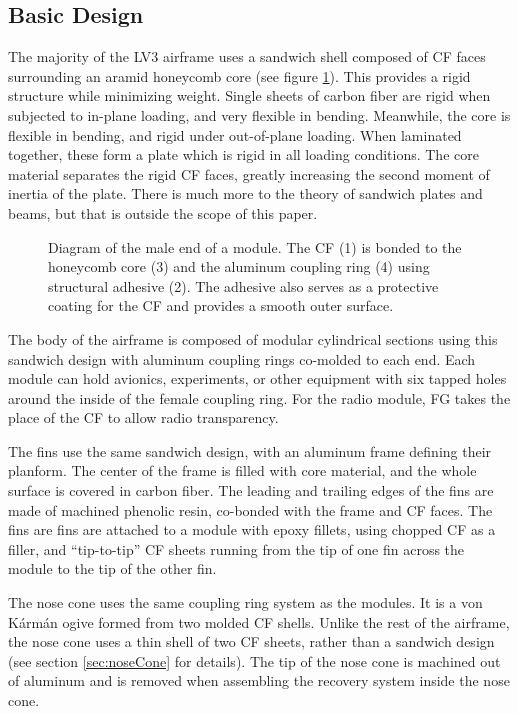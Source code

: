 \documentclass{aiaa-tc}%
\begin{document}
\subsection{Basic Design}

The majority of the LV3 airframe uses a sandwich shell composed of CF faces surrounding an aramid honeycomb core (see figure \ref{fig:moduleDiagram}). This provides a rigid structure while minimizing weight. 
Single sheets of carbon fiber are rigid when subjected to in-plane loading, and very flexible in bending. Meanwhile, the core is flexible in bending, and rigid under out-of-plane loading. 
When laminated together, these form a plate which is rigid in all loading conditions. The core material separates the rigid CF faces, greatly increasing the second moment of inertia of the plate. 
There is much more to the theory of sandwich plates and beams, but that is outside the scope of this paper. 

\begin{figure}
\centering
\def\svgwidth{\linewidth}

\caption{Diagram of the male end of a module. The CF (1) is bonded to the honeycomb core (3) and the aluminum coupling ring (4) using structural adhesive (2). The adhesive also serves as a protective coating for the CF and provides a smooth outer surface.}
\label{fig:moduleDiagram}
\end{figure}

The body of the airframe is composed of modular cylindrical sections using this sandwich design with aluminum coupling rings co-molded to each end.
Each module can hold avionics, experiments, or other equipment with six tapped holes around the inside of the female coupling ring. 
For the radio module, FG takes the place of the CF to allow radio transparency.

The fins use the same sandwich design, with an aluminum frame defining their planform. The center of the frame is filled with core material, and the whole surface is covered in carbon fiber. 
The leading and trailing edges of the fins are made of machined phenolic resin, co-bonded with the frame and CF faces. 
The fins are fins are attached to a module with epoxy fillets, using chopped CF as a filler, and ``tip-to-tip'' CF sheets running from the tip of one fin across the module to the tip of the other fin.

The nose cone uses the same coupling ring system as the modules. It is a von K\'arm\'an ogive formed from two molded CF shells. 
Unlike the rest of the airframe, the nose cone uses a thin shell of two CF sheets, rather than a sandwich design (see section \ref{sec:noseCone} for details). 
The tip of the nose cone is machined out of aluminum and is removed when assembling the recovery system inside the nose cone. 
\end{document}

